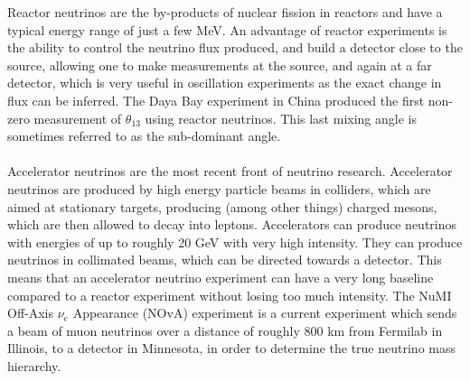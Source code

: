 \documentclass[12pt]{article}
\begin{document}
Reactor neutrinos are the by-products of nuclear fission in reactors and have a typical energy range of just a few MeV\cite{reactor}. An advantage of reactor experiments is the ability to control the neutrino flux produced, and build a detector close to the source, allowing one to make measurements at the source, and again at a far detector, which is very useful in oscillation experiments as the exact change in flux can be inferred. The Daya Bay experiment in China produced the first non-zero measurement of $\theta_{13}$ using reactor neutrinos\cite{Daya}. This last mixing angle is sometimes referred to as the sub-dominant angle.\\\\
Accelerator neutrinos are the most recent front of neutrino research. Accelerator neutrinos are produced by high energy particle beams in colliders, which are aimed at stationary targets, producing (among other things) charged mesons, which are then allowed to decay into leptons. Accelerators can produce neutrinos with energies of up to roughly 20 GeV with very high intensity\cite{accelerator}. They can produce neutrinos in collimated beams, which can be directed towards a detector. This means that an accelerator neutrino experiment can have a very long baseline compared to a reactor experiment without losing too much intensity. The NuMI Off-Axis $\nu_e$ Appearance (NOvA) experiment is a current experiment which sends a beam of muon neutrinos over a distance of roughly 800 km from Fermilab in Illinois, to a detector in Minnesota, in order to determine the true neutrino mass hierarchy\cite{NOvA}.
\end{document}
